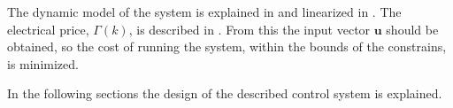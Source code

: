 The dynamic model of the system is explained in  and linearized in . The electrical price, $\Gamma(k)$, is described in . From this the input vector $\pmb{u}$ should be obtained, so the cost of running the system, within the bounds of the constrains, is minimized. 



In the following sections the design of the described control system is explained. 







